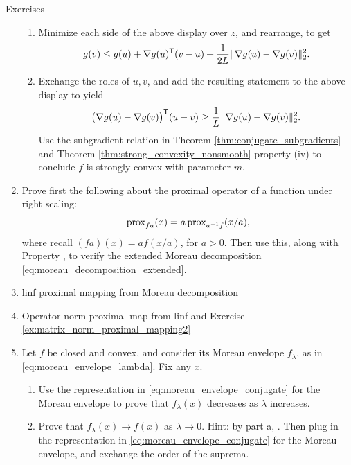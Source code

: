 \begin{xcb}{Exercises}
\begin{enumerate}[label=\thechapter.\arabic*]
\begin{enumerate}[label=\alph*.]
\item Minimize each side of the above display over $z$, and rearrange, to get  
  \[
  g(v) \leq g(u) + \nabla g(u)^{\mathsf{T}} (v-u) + \frac{1}{2L}\|\nabla g(u) - \nabla 
  g(v)\|_2^2. 
  \]

\item Exchange the roles of $u,v$, and add the resulting statement to the above
  display to yield 
  \[
  \big(\nabla g(u) - \nabla g(v)\big)^{\mathsf{T}} (u-v) \geq \frac{1}{L}\|\nabla g(u) -
  \nabla g(v)\|_2^2. 
  \]
  Use the subgradient relation in Theorem \ref{thm:conjugate_subgradients} and
  Theorem \ref{thm:strong_convexity_nonsmooth} property (iv) to conclude $f$ is
  strongly convex with parameter $m$. 
\end{enumerate}

\item \label{ex:moreau_decomposition_extended}
  Prove first the following about the proximal operator of a function under
  right scaling: 
  \[
  \operatorname{prox}_{fa}(x) = a \operatorname{prox}_{a^{-1} f} (x/a), 
  \] 
  where recall $(fa)(x) = a f(x/a)$, for $a>0$. Then use this, along with
  Property , to verify the extended Moreau
  decomposition \eqref{eq:moreau_decomposition_extended}.  

\item \label{ex:linf_norm_proximal_mapping}
linf proximal mapping from Moreau decomposition

\item \label{ex:operator_norm_proximal_mapping} 
  Operator norm proximal map from linf and Exercise
  \ref{ex:matrix_norm_proximal_mapping2}   

\item \label{ex:moreau_envelope_conjugate}
  Let $f$ be closed and convex, and consider its Moreau envelope $f_\lambda$, as
  in \eqref{eq:moreau_envelope_lambda}. Fix any $x$.

\begin{enumerate}[label=\alph*.]
\item Use the representation in \eqref{eq:moreau_envelope_conjugate} for the
  Moreau envelope to prove that $f_\lambda(x)$ decreases as $\lambda$ increases.  

\item Prove that $f_\lambda(x) \to f(x)$ as $\lambda \to 0$. Hint: by part a, 
  . Then plug in the representation in
  \eqref{eq:moreau_envelope_conjugate} for the Moreau envelope, and exchange the 
  order of the suprema.   
\end{enumerate}
\end{enumerate}
\end{xcb}
